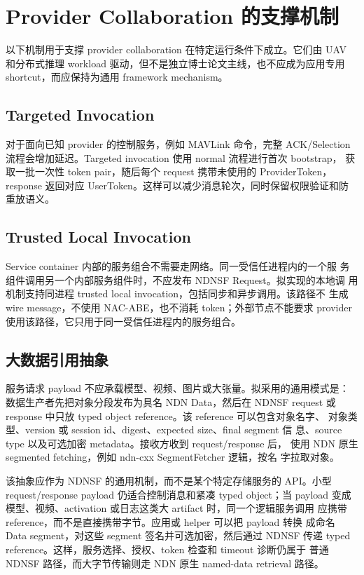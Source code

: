 \section{Provider Collaboration 的支撑机制}

以下机制用于支撑 provider collaboration 在特定运行条件下成立。它们由 UAV
和分布式推理 workload 驱动，但不是独立博士论文主线，也不应成为应用专用
shortcut，而应保持为通用 framework mechanism。

\subsection{Targeted Invocation}

对于面向已知 provider 的控制服务，例如 MAVLink 命令，完整 ACK/Selection
流程会增加延迟。Targeted invocation 使用 normal 流程进行首次 bootstrap，
获取一批一次性 token pair，随后每个 request 携带未使用的 ProviderToken，
response 返回对应 UserToken。这样可以减少消息轮次，同时保留权限验证和防
重放语义。

\subsection{Trusted Local Invocation}

Service container 内部的服务组合不需要走网络。同一受信任进程内的一个服
务组件调用另一个内部服务组件时，不应发布 NDNSF Request。拟实现的本地调
用机制支持同进程 trusted local invocation，包括同步和异步调用。该路径不
生成 wire message，不使用 NAC-ABE，也不消耗 token；外部节点不能要求
provider 使用该路径，它只用于同一受信任进程内的服务组合。

\subsection{大数据引用抽象}

服务请求 payload 不应承载模型、视频、图片或大张量。拟采用的通用模式是：
数据生产者先把对象分段发布为具名 NDN Data，然后在 NDNSF request 或
response 中只放 typed object reference。该 reference 可以包含对象名字、
对象类型、version 或 session id、digest、expected size、final segment 信
息、source type 以及可选加密 metadata。接收方收到 request/response 后，
使用 NDN 原生 segmented fetching，例如 ndn-cxx SegmentFetcher 逻辑，按名
字拉取对象。

该抽象应作为 NDNSF 的通用机制，而不是某个特定存储服务的 API。小型
request/response payload 仍适合控制消息和紧凑 typed object；当 payload
变成模型、视频、activation 或日志这类大 artifact 时，同一个逻辑服务调用
应携带 reference，而不是直接携带字节。应用或 helper 可以把 payload 转换
成命名 Data segment，对这些 segment 签名并可选加密，然后通过 NDNSF 传递
typed reference。这样，服务选择、授权、token 检查和 timeout 诊断仍属于
普通 NDNSF 路径，而大字节传输则走 NDN 原生 named-data retrieval 路径。

